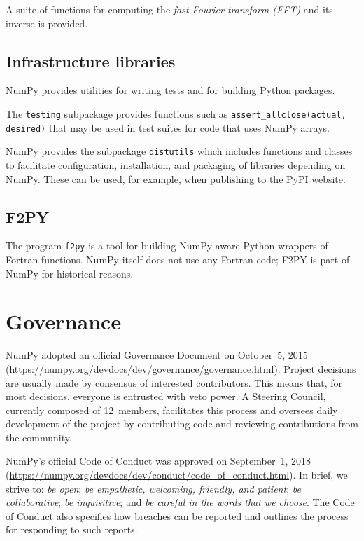 \documentclass{article}
\begin{document}
A suite of functions for computing the \emph{fast Fourier transform (FFT)}
and its inverse is provided.

\subsection*{Infrastructure libraries}

NumPy provides utilities for writing tests and for building Python packages.

The \texttt{testing} subpackage provides functions such as
\texttt{assert\_allclose(actual, desired)} that may be used in
test suites for code that uses NumPy arrays.

NumPy provides the subpackage \texttt{distutils} which includes functions and classes
to facilitate configuration, installation, and packaging of libraries depending on NumPy.
These can be used, for example, when publishing to the PyPI website.

\subsection*{F2PY}  The program \texttt{f2py} is a tool for
building NumPy-aware Python wrappers of Fortran functions.
NumPy itself does not use any Fortran code;  F2PY is part of NumPy
for historical reasons.


\section*{Governance}

NumPy adopted an official Governance Document on October~5,
2015 (\url{https://numpy.org/devdocs/dev/governance/governance.html}).
Project decisions are usually made by consensus of interested contributors.
This means that, for most decisions, everyone is entrusted with veto power.
A Steering Council, currently composed of 12~members, facilitates this
process and oversees daily development of the project by contributing code
and reviewing contributions from the community.

NumPy's official Code of Conduct was approved on September~1, 2018
(\url{https://numpy.org/devdocs/dev/conduct/code_of_conduct.html}).
In brief, we strive to:
\emph{be open};
\emph{be empathetic, welcoming, friendly, and patient};
\emph{be collaborative};
\emph{be inquisitive}; and
\emph{be careful in the words that we choose}.
The Code of Conduct also specifies how breaches can be reported and outlines
the process for responding to such reports.
\end{document}
